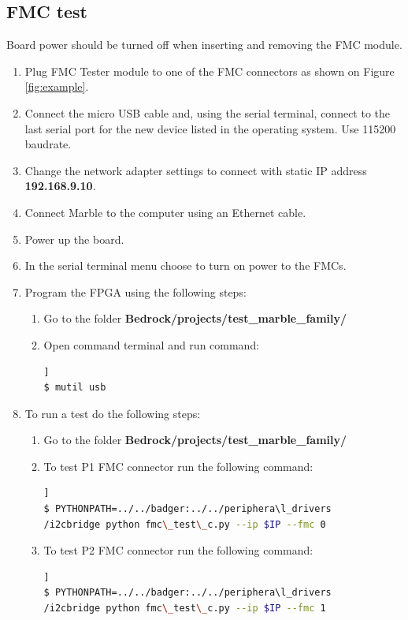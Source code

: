 \documentclass[12pt,oneside,a4]{article}
\begin{document}
\subsection{FMC test}
\begin{leftbar}
Board power should be turned off when inserting and removing the FMC module.
\end{leftbar}
\begin{enumerate}
	\item Plug FMC Tester module to one of the FMC connectors as shown on Figure \ref{fig:example}.
	\item Connect the micro USB cable and, using the serial terminal, connect to the last serial port for the new device listed in the operating system. Use 115200 baudrate.
	\item Change the network adapter settings to connect with static IP address \textbf{192.168.9.10}.
    \item Connect Marble to the computer using an Ethernet cable.
    \item Power up the board.
    \item In the serial terminal menu choose  to turn on power to the FMCs.
	\item Program the FPGA using the following steps:
	\begin{enumerate}
	\item Go to the folder \textbf{Bedrock/projects/test\_marble\_family/}
	\item Open command terminal and run command:
	\begin{lstlisting}[backgroundcolor = \color{Gainsboro}, language=bash, frame=none]]
$ mutil usb
	\end{lstlisting}
	\end{enumerate}
	\item To run a test do the following steps:
	\begin{enumerate}
	\item Go to the folder \textbf{Bedrock/projects/test\_marble\_family/}
	\item To test P1 FMC connector run the following command:
	\begin{lstlisting}[backgroundcolor = \color{Gainsboro}, language=bash, frame=none]]
$ PYTHONPATH=../../badger:../../periphera\l_drivers
/i2cbridge python fmc\_test\_c.py --ip $IP --fmc 0
	\end{lstlisting}
	\item To test P2 FMC connector run the following command:
	\begin{lstlisting}[backgroundcolor = \color{Gainsboro}, language=bash, frame=none]]
$ PYTHONPATH=../../badger:../../periphera\l_drivers
/i2cbridge python fmc\_test\_c.py --ip $IP --fmc 1
	\end{lstlisting}
	\end{enumerate}
\end{enumerate}
\end{document}
